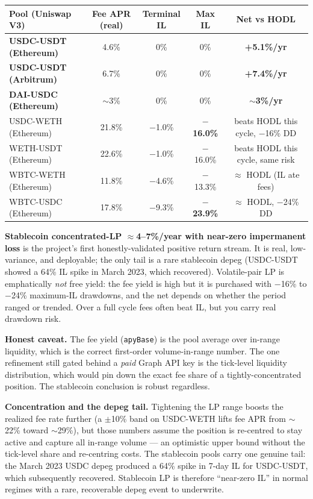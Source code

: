 \documentclass[11pt,a4paper]{article}
\newcommand{\up}[1]{{\color{good}\textbf{#1}}}
\newcommand{\dn}[1]{{\color{crit}\textbf{#1}}}
\begin{document}
\begin{center}
\begin{tabular}{lcccc}
\toprule
Pool (Uniswap V3) & Fee APR (real) & Terminal IL & Max IL & Net vs HODL \\
\midrule
\textbf{USDC-USDT (Ethereum)} & 4.6\% & 0\% & 0\% & \up{+5.1\%/yr} \\
\textbf{USDC-USDT (Arbitrum)} & 6.7\% & 0\% & 0\% & \up{+7.4\%/yr} \\
\textbf{DAI-USDC (Ethereum)} & $\sim$3\% & 0\% & 0\% & \up{$\sim$3\%/yr} \\
USDC-WETH (Ethereum) & 21.8\% & $-$1.0\% & \dn{$-$16.0\%} & beats HODL this cycle, $-$16\% DD \\
WETH-USDT (Ethereum) & 22.6\% & $-$1.0\% & $-$16.0\% & beats HODL this cycle, same risk \\
WBTC-WETH (Ethereum) & 11.8\% & $-$4.6\% & $-$13.3\% & $\approx$ HODL (IL ate fees) \\
WBTC-USDC (Ethereum) & 17.8\% & $-$9.3\% & \dn{$-$23.9\%} & $\approx$ HODL, $-$24\% DD \\
\bottomrule
\end{tabular}
\end{center}

\dn{Stablecoin concentrated-LP $\approx$4--7\%/year with near-zero impermanent loss} is the project's first honestly-validated positive return stream. It is real, low-variance, and deployable; the only tail is a rare stablecoin depeg (USDC-USDT showed a 64\% IL spike in March 2023, which recovered). Volatile-pair LP is emphatically \emph{not} free yield: the fee yield is high but it is purchased with $-$16\% to $-$24\% maximum-IL drawdowns, and the net depends on whether the period ranged or trended. Over a full cycle fees often beat IL, but you carry real drawdown risk.

\textbf{Honest caveat.} The fee yield (\texttt{apyBase}) is the pool average over in-range liquidity, which is the correct first-order volume-in-range number. The one refinement still gated behind a \emph{paid} Graph API key is the tick-level liquidity distribution, which would pin down the exact fee share of a tightly-concentrated position. The stablecoin conclusion is robust regardless.

\textbf{Concentration and the depeg tail.} Tightening the LP range boosts the realized fee rate further (a $\pm$10\% band on USDC-WETH lifts fee APR from $\sim$22\% toward $\sim$29\%), but those numbers assume the position is re-centred to stay active and capture all in-range volume --- an optimistic upper bound without the tick-level share and re-centring costs. The stablecoin pools carry one genuine tail: the March 2023 USDC depeg produced a 64\% spike in 7-day IL for USDC-USDT, which subsequently recovered. Stablecoin LP is therefore ``near-zero IL'' in normal regimes with a rare, recoverable depeg event to underwrite.
\end{document}
